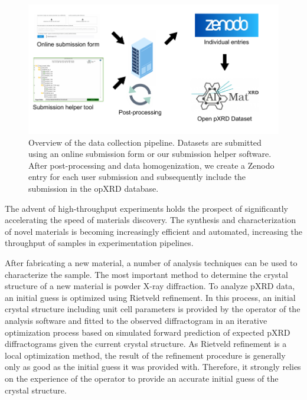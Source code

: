 

\begin{figure}[!ht]
    \centering
    \includegraphics{figures/overview.pdf}
    \caption{Overview of the data collection pipeline. Datasets are submitted using an online submission form or our submission helper software. After post-processing and data homogenization, we create a Zenodo entry for each user submission and subsequently include the submission in the opXRD database.}
    \label{fig:overview}
\end{figure}

The advent of high-throughput experiments holds the prospect of significantly accelerating the speed of materials discovery. \cite{Liu2019}
The synthesis and characterization of novel materials is becoming increasingly efficient and automated,
increasing the throughput of samples in experimentation pipelines. \cite{MacLeod2019} \cite{Ludwig2019} \cite{Ozaki2020}

After fabricating a new material, a number of analysis techniques can be used to characterize the sample.
The most important method to determine the crystal structure of a new material is powder X-ray diffraction. 
To analyze pXRD data, an initial guess is optimized using Rietveld refinement. In this process, an initial crystal structure including unit cell parameters is provided by the operator of the analysis software and fitted to the observed diffractogram in an iterative optimization process based on simulated forward prediction of expected pXRD diffractograms given the current crystal structure.\cite{Dinnebier2019} \cite{Cano2021}
As Rietveld refinement is a local optimization method, the result of the refinement procedure is generally only as good as the initial guess it was provided with.
Therefore, it strongly relies on the experience of the operator to provide an accurate initial guess of the crystal structure.

